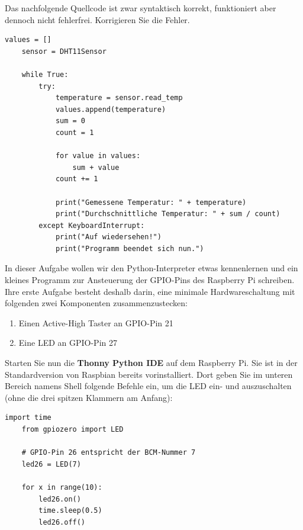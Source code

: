 \teilaufgabe
Das nachfolgende Quellcode ist zwar syntaktisch korrekt, funktioniert aber
dennoch nicht fehlerfrei. Korrigieren Sie die Fehler.

\begin{Verbatim}[gobble=4]
    values = []
    sensor = DHT11Sensor

    while True:
        try:
            temperature = sensor.read_temp
            values.append(temperature)
            sum = 0
            count = 1

            for value in values:
                sum + value
            count += 1

            print("Gemessene Temperatur: " + temperature)
            print("Durchschnittliche Temperatur: " + sum / count)
        except KeyboardInterrupt:
            print("Auf wiedersehen!")
            print("Programm beendet sich nun.")
\end{Verbatim}

\teilaufgabe
In dieser Aufgabe wollen wir den Python-Interpreter etwas kennenlernen und ein
kleines Programm zur Ansteuerung der GPIO-Pins des Raspberry Pi schreiben.
Ihre erste Aufgabe besteht deshalb darin, eine minimale Hardwareschaltung mit
folgenden zwei Komponenten zusammenzustecken:

\begin{enumerate}
    \item Einen Active-High Taster an GPIO-Pin 21
    \item Eine LED an GPIO-Pin 27
\end{enumerate}

\teilaufgabe
Starten Sie nun die \textbf{Thonny Python IDE} auf dem Raspberry Pi. Sie ist
in der Standardversion von Raspbian bereits vorinstalliert. Dort geben Sie im
unteren Bereich namens \glqq{}Shell\grqq{} folgende Befehle ein, um die LED ein-
und auszuschalten (ohne die drei spitzen Klammern am Anfang):

\begin{Verbatim}[gobble=4]
    import time
    from gpiozero import LED

    # GPIO-Pin 26 entspricht der BCM-Nummer 7
    led26 = LED(7)

    for x in range(10):
        led26.on()
        time.sleep(0.5)
        led26.off()
\end{Verbatim}

